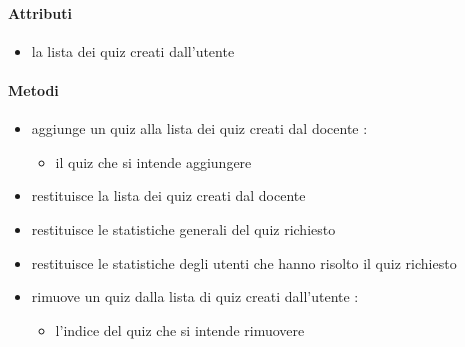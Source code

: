 \paragraph{Attributi}
\begin{itemize}
\item {}
\newline
la lista dei quiz creati dall'utente
\end{itemize}
\paragraph{Metodi}
\begin{itemize}
\item {}
\newline
aggiunge un quiz alla lista dei quiz creati dal docente
\newline
{} :
\begin{itemize}
\item {}
\newline
il quiz che si intende aggiungere
\end{itemize}
\item {}
\newline
restituisce la lista dei quiz creati dal docente
\newline
\item {}
\newline
restituisce le statistiche generali del quiz richiesto
\newline
\item {}
\newline
restituisce le statistiche degli utenti che hanno risolto il quiz richiesto
\newline
\item {}
\newline
rimuove un quiz dalla lista di quiz creati dall'utente
\newline
{} :
\begin{itemize}
\item {}
\newline
l'indice del quiz che si intende rimuovere
\end{itemize}
\end{itemize}
